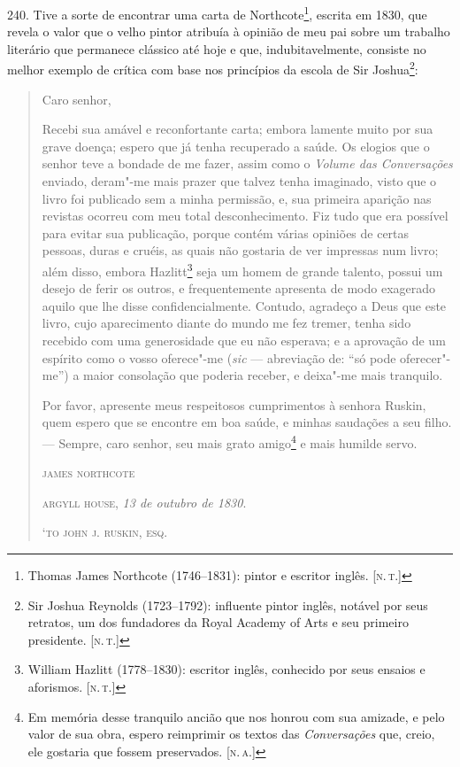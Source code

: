 240. Tive a sorte de encontrar uma carta de Northcote\footnote{Thomas
  James Northcote (1746--1831): pintor e escritor inglês. {[}\textsc{n.\,t.}{]}},
escrita em 1830, que revela o valor que o velho pintor atribuía à
opinião de meu pai sobre um trabalho literário que permanece clássico
até hoje e que, indubitavelmente, consiste no melhor exemplo de crítica
com base nos princípios da escola de Sir Joshua\footnote{Sir Joshua
  Reynolds (1723--1792): influente pintor inglês, notável por seus
  retratos, um dos fundadores da Royal Academy of Arts e seu primeiro
  presidente. {[}\textsc{n.\,t.}{]}}: %

\begin{quote}
Caro senhor,

Recebi sua amável e reconfortante carta; embora
lamente muito por sua grave doença; espero que já tenha recuperado a
saúde. Os elogios que o senhor teve a bondade de me fazer, assim como o
\emph{Volume das Conversações} enviado, deram"-me mais prazer que talvez
tenha imaginado, visto que o livro foi publicado sem a minha permissão,
e, sua primeira aparição nas revistas ocorreu com meu total
desconhecimento. Fiz tudo que era possível para evitar sua publicação,
porque contém várias opiniões de certas pessoas, duras e cruéis, as
quais não gostaria de ver impressas num livro; além disso, embora
Hazlitt\footnote{William Hazlitt (1778--1830): escritor inglês, conhecido
  por seus ensaios e aforismos. {[}\textsc{n.\,t.}{]}} seja um homem de grande
talento, possui um desejo de ferir os outros, e frequentemente apresenta
de modo exagerado aquilo que lhe disse confidencialmente. Contudo,
agradeço a Deus que este livro, cujo aparecimento diante do mundo me fez
tremer, tenha sido recebido com uma generosidade que eu não esperava; e
a aprovação de um espírito como o vosso oferece"-me (\emph{sic} ---
abreviação de: ``só pode oferecer"-me'') a maior consolação que poderia
receber, e deixa"-me mais tranquilo.

Por favor, apresente meus respeitosos cumprimentos à senhora Ruskin,
quem espero que se encontre em boa saúde, e minhas saudações a seu
filho. --- Sempre, caro senhor, seu mais grato amigo\footnote{Em memória
  desse tranquilo ancião que nos honrou com sua amizade, e pelo valor de
  sua obra, espero reimprimir os textos das \emph{Conversações} que,
  creio, ele gostaria que fossem preservados. {[}\textsc{n.\,a.}{]}} e mais
humilde servo.

\bigskip

\hfill\textsc{james northcote}

\hfill\textsc{argyll house}, \emph{13 de outubro de 1830}.

\hfill\textsc{`to john j. ruskin, esq.}
\end{quote}

